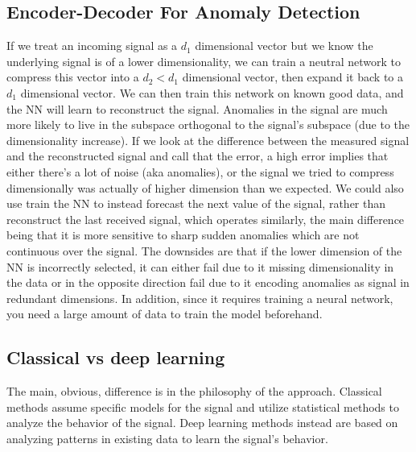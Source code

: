 \subsection{Encoder-Decoder For Anomaly Detection}
If we treat an incoming signal as a \(d_1\) dimensional vector but we know the underlying signal is of a lower dimensionality, we can train a neutral network to compress this vector into a \(d_2 < d_1\) dimensional vector, then expand it back to a \(d_1\) dimensional vector. We can then train this network on known good data, and the NN will learn to reconstruct the signal. Anomalies in the signal are much more likely to live in the subspace orthogonal to the signal's subspace (due to the dimensionality increase). If we look at the difference between the measured signal and the reconstructed signal and call that the error, a high error implies that either there's a lot of noise (aka anomalies), or the signal we tried to compress dimensionally was actually of higher dimension than we expected. We could also use train the NN to instead forecast the next value of the signal, rather than reconstruct the last received signal, which operates similarly, the main difference being that it is more sensitive to sharp sudden anomalies which are not continuous over the signal. The downsides are that if the lower dimension of the NN is incorrectly selected, it can either fail due to it missing dimensionality in the data or in the opposite direction fail due to it encoding anomalies as signal in redundant dimensions. In addition, since it requires training a neural network, you need a large amount of data to train the model beforehand.
\subsection{Classical vs deep learning}
The main, obvious, difference is in the philosophy of the approach. Classical methods assume specific models for the signal and utilize statistical methods to analyze the behavior of the signal. Deep learning methods instead are based on analyzing patterns in existing data to learn the signal's behavior.
